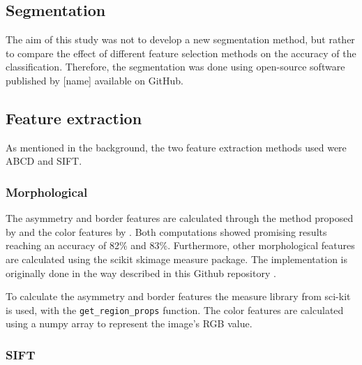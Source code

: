 \documentclass{kththesis}
\begin{document}

\subsection{Segmentation}


The aim of this study was not to develop a new segmentation method, but rather to compare the effect of different feature selection methods on the accuracy of the classification. Therefore, the segmentation was done using open-source software published by [name] available on GitHub.

\subsection{Feature extraction}

As mentioned in the background, the two feature extraction methods used were ABCD and SIFT.

\subsubsection{Morphological} %


The asymmetry and border features are calculated through the method proposed by \parencite{inproceedings} and the color features by \parencite{celebi2008automatic}. Both computations showed promising results reaching an accuracy of 82\% and 83\%. Furthermore, other morphological features are calculated using the scikit skimage measure package. The implementation is originally done in the way described in this Github repository \parencite{melanoma-classifier}.

To calculate the asymmetry and border features the measure library from sci-kit is used, with the \verb|get_region_props| function.
The color features are calculated using a numpy array to represent the image's RGB value.



\subsubsection{SIFT}
\end{document}
